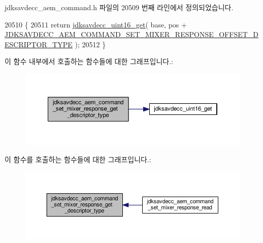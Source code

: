 jdksavdecc\+\_\+aem\+\_\+command.\+h 파일의 20509 번째 라인에서 정의되었습니다.


\begin{DoxyCode}
20510 \{
20511     \textcolor{keywordflow}{return} \hyperlink{group__endian_ga3fbbbc20be954aa61e039872965b0dc9}{jdksavdecc\_uint16\_get}( base, pos + 
      \hyperlink{group__command__set__mixer__response_ga2a1ce9786da431666e786485a051c4c3}{JDKSAVDECC\_AEM\_COMMAND\_SET\_MIXER\_RESPONSE\_OFFSET\_DESCRIPTOR\_TYPE}
       );
20512 \}
\end{DoxyCode}


이 함수 내부에서 호출하는 함수들에 대한 그래프입니다.\+:
\nopagebreak
\begin{figure}[H]
\begin{center}
\leavevmode
\includegraphics[width=350pt]{group__command__set__mixer__response_gae1b7fe6fbfacd91d3cc4ca7cd99142bc_cgraph}
\end{center}
\end{figure}




이 함수를 호출하는 함수들에 대한 그래프입니다.\+:
\nopagebreak
\begin{figure}[H]
\begin{center}
\leavevmode
\includegraphics[width=350pt]{group__command__set__mixer__response_gae1b7fe6fbfacd91d3cc4ca7cd99142bc_icgraph}
\end{center}
\end{figure}


